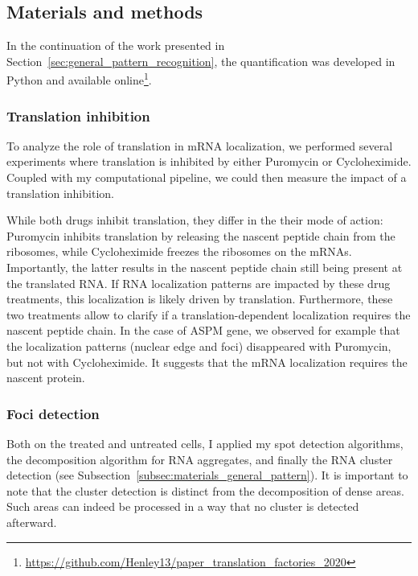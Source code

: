 \subsection{Materials and methods}
\label{subsec:materials_translation_factories}

In the continuation of the work presented in Section~\ref{sec:general_pattern_recognition}, the quantification was developed in Python and available online\footnote{\url{https://github.com/Henley13/paper_translation_factories_2020}}.

\subsubsection{Translation inhibition}

To analyze the role of translation in \ac{mRNA} localization, we performed several experiments where translation is inhibited by either Puromycin or Cycloheximide.
Coupled with my computational pipeline, we could then measure the impact of a translation inhibition.

While both drugs inhibit translation, they differ in the their mode of action:
Puromycin inhibits translation by releasing the nascent peptide chain from the ribosomes, while Cycloheximide freezes the ribosomes on the \ac{mRNA}s.
Importantly, the latter results in the nascent peptide chain still being present at the translated RNA.
If RNA localization patterns are impacted by these drug treatments, this localization is likely driven by translation.
Furthermore, these two treatments allow to clarify if a translation-dependent localization requires the nascent peptide chain.
In the case of ASPM gene, we observed for example that the localization patterns (nuclear edge and foci) disappeared with Puromycin, but not with Cycloheximide.
It suggests that the \ac{mRNA} localization requires the nascent protein.

\subsubsection{Foci detection}

Both on the treated and untreated cells, I applied my spot detection algorithms, the decomposition algorithm for RNA aggregates, and finally the \ac{RNA} cluster detection (see Subsection~\ref{subsec:materials_general_pattern}).
It is important to note that the cluster detection is distinct from the decomposition of dense areas.
Such areas can indeed be processed in a way that no cluster is detected afterward.

